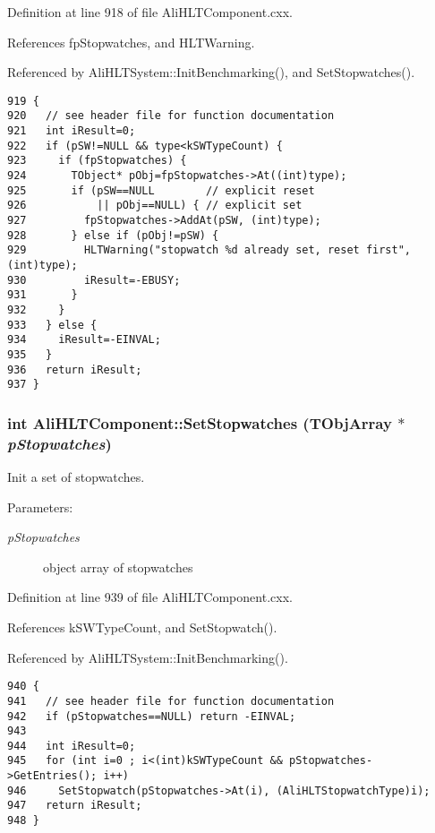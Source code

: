 Definition at line 918 of file Ali\-HLTComponent.cxx.

References fp\-Stopwatches, and HLTWarning.

Referenced by Ali\-HLTSystem::Init\-Benchmarking(), and Set\-Stopwatches().

\footnotesize\begin{verbatim}919 {
920   // see header file for function documentation
921   int iResult=0;
922   if (pSW!=NULL && type<kSWTypeCount) {
923     if (fpStopwatches) {
924       TObject* pObj=fpStopwatches->At((int)type);
925       if (pSW==NULL        // explicit reset
926           || pObj==NULL) { // explicit set
927         fpStopwatches->AddAt(pSW, (int)type);
928       } else if (pObj!=pSW) {
929         HLTWarning("stopwatch %d already set, reset first", (int)type);
930         iResult=-EBUSY;
931       }
932     }
933   } else {
934     iResult=-EINVAL;
935   }
936   return iResult;
937 }
\end{verbatim}\normalsize 


\subsubsection{\setlength{\rightskip}{0pt plus 5cm}int Ali\-HLTComponent::Set\-Stopwatches (TObj\-Array $\ast$ {\em p\-Stopwatches})}\label{classAliHLTComponent_a18}


Init a set of stopwatches. \begin{Desc}
\item[Parameters:]
\begin{description}
\item[{\em p\-Stopwatches}]object array of stopwatches \end{description}
\end{Desc}


Definition at line 939 of file Ali\-HLTComponent.cxx.

References k\-SWType\-Count, and Set\-Stopwatch().

Referenced by Ali\-HLTSystem::Init\-Benchmarking().

\footnotesize\begin{verbatim}940 {
941   // see header file for function documentation
942   if (pStopwatches==NULL) return -EINVAL;
943 
944   int iResult=0;
945   for (int i=0 ; i<(int)kSWTypeCount && pStopwatches->GetEntries(); i++)
946     SetStopwatch(pStopwatches->At(i), (AliHLTStopwatchType)i);
947   return iResult;
948 }
\end{verbatim}\normalsize 



